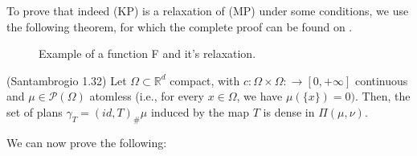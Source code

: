 To prove that indeed (KP) is a relaxation of (MP) under some conditions,
we use the following theorem, for which the complete proof can be found
on \citet{santambrogio2015optimal}.

\begin{figure}[H]
  \centering
  
  \caption{Example of a function F and it's relaxation.}
  \label{fig:relaxation_ex}
\end{figure}

\begin{theorem}(Santambrogio 1.32)
  Let $\Omega \subset \mathbb R^d$ compact, with
  $c:\Omega\times \Omega: \to [0,+\infty]$ continuous and
  $\mu \in \mathcal P(\Omega)$ atomless (i.e., for every
  $x \in \Omega$, we have $\mu(\{x\}) = 0)$.
  Then, the set of plans
  $\gamma_T = (id, T)_\# \mu$ induced by the map $T$ is dense in
  $\Pi(\mu,\nu)$.
  \label{thm:dense_mp}
\end{theorem}

We can now prove the following:

